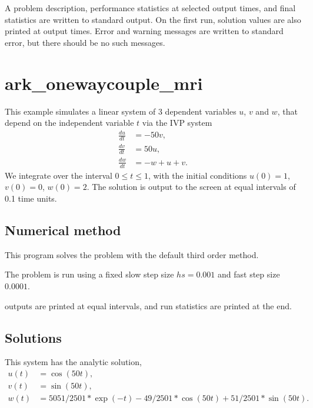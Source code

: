 \documentclass[letterpaper,10pt,english]{sphinxmanual}
\begin{document}
\sphinxAtStartPar
A problem description, performance statistics at selected output
times, and final statistics are written to standard output.  On the
first run, solution values are also printed at output times.  Error
and warning messages are written to standard error, but there should
be no such messages.


\section{ark\_onewaycouple\_mri}
\label{\detokenize{c_serial:ark-onewaycouple-mri}}\label{\detokenize{c_serial:id33}}
\sphinxAtStartPar
This example simulates a linear system of 3 dependent variables \(u\),
\(v\) and \(w\), that depend on the independent variable \(t\) via
the IVP system
\begin{equation*}
\begin{split}\frac{du}{dt} &= -50 v, \\
\frac{dv}{dt} &= 50 u, \\
\frac{dw}{dt} &= -w + u + v.\end{split}
\end{equation*}
\sphinxAtStartPar
We integrate over the interval \(0 \le t \le 1\), with the initial
conditions \(u(0) = 1\), \(v(0) = 0\), \(w(0)= 2\).  The
solution is output to the screen at equal intervals of 0.1 time units.


\subsection{Numerical method}
\label{\detokenize{c_serial:id34}}
\sphinxAtStartPar
This program solves the problem with the default third order method.

\sphinxAtStartPar
The problem is run using a fixed slow step size \(hs=0.001\) and fast step
size \(0.0001\).

 outputs are printed at equal intervals, and run statistics
are printed at the end.


\subsection{Solutions}
\label{\detokenize{c_serial:id35}}
\sphinxAtStartPar
This system has the analytic solution,
\begin{equation*}
\begin{split}u(t) &= \cos(50t), \\
v(t) &= \sin(50t), \\
w(t) &= 5051/2501*\exp(-t) - 49/2501*\cos(50t) + 51/2501*\sin(50t).\end{split}
\end{equation*}
\end{document}

